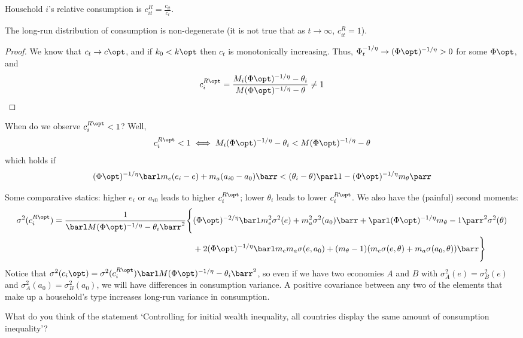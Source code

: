 \documentclass[10pt]{article}
\begin{document}
\begin{model}
	Household $i$'s relative consumption is $c_{it}^R = \frac{c_{it}}{c_t}$.
	
	\begin{proposition}
		The long-run distribution of consumption is non-degenerate (\ie it is not true that as $t \to \infty$, $c_{it}^R = 1$).
	\end{proposition}
	\begin{proof}
		We know that $c_t \to c\opt$, and if $k_0 < k\opt$ then $c_t$ is monotonically increasing. Thus, $\Phi_t^{-1/\eta} \to (\Phi\opt)^{-1/\eta} > 0$ for some $\Phi\opt$, and \[c_i^{R\opt} = \frac{M_i (\Phi\opt)^{-1/\eta} - \theta_i}{M (\Phi\opt)^{-1/\eta} - \theta} \ne 1\]
	\end{proof}
	\begin{question}
		When do we observe $c^{R\opt}_i < 1$? Well, \[c^{R\opt}_i < 1\iff M_i (\Phi\opt)^{-1/\eta} - \theta_i < M (\Phi\opt)^{-1/\eta} - \theta \]which holds if \[(\Phi\opt)^{-1/\eta}\barl m_e (e_i - e) + m_a(a_{i0} - a_0)\barr < (\theta_i - \theta)\parl 1 - (\Phi\opt)^{-1/\eta}m_\theta\parr\]
	\end{question}
	\begin{remark}
		Some comparative statics: higher $e_i$ or $a_{i0}$ leads to higher $c_i^{R\opt}$; lower $\theta_i$ leads to lower $c_i^{R\opt}$. We also have the (painful) second moments: 
		\begin{align*} 
			\sigma^2(c_i^{R\opt}) = \frac{1}{\barl M (\Phi\opt)^{-1/\eta} - \theta_i\barr^2}\Bigg\{ &(\Phi\opt)^{-2/\eta}\barl m_e^2 \sigma^2(e) + m_a^2\sigma^2(a_0)\barr + \parl (\Phi\opt)^{-1/\eta} m_\theta - 1\parr^2\sigma^2(\theta) \\ &+ 2(\Phi\opt)^{-1/\eta}\barl m_em_a\sigma(e,a_0) + (m_\theta-1)(m_e \sigma(e,\theta) + m_a \sigma(a_0,\theta))\barr\Bigg\}
		\end{align*}
		Notice that $\sigma^2(c_i\opt) = \sigma^2(c_i^{R\opt}) \barl M (\Phi\opt)^{-1/\eta} - \theta_i\barr^2$, so even if we have two economies $A$ and $B$ with $\sigma^2_A(e) =\sigma^2_B(e) $ and $\sigma^2_A(a_0) = \sigma^2_B(a_0)$, we will have differences in consumption variance. A positive covariance between any two of the elements that make up a household's type increases long-run variance in consumption. 
	\end{remark}
	\begin{question}
		What do you think of the statement `Controlling for initial wealth inequality, all countries display the same amount of consumption inequality'?
	\end{question}
\end{model}
\end{document}
